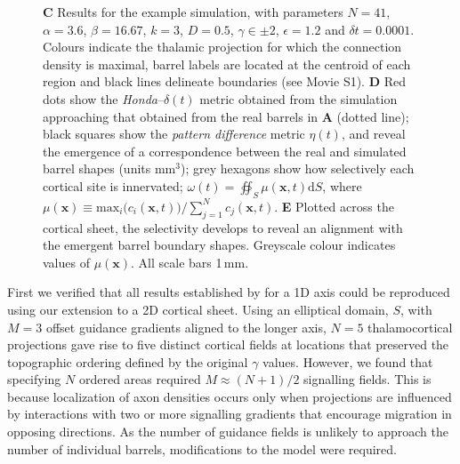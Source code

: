 \documentclass[9pt,lineno]{elife}
\newcommand{\cmnt}[1]{\textcolor{colcmnt}{#1}}
\newcommand{\MPtwo}[1]{\textcolor{colmptwo}{#1}}
\newcommand{\metrics}[1]{\textcolor{colmetrics}{#1}}
\newcommand{\mb}[1]{\mathbf{#1}}
\begin{document}
\begin{figure}
\begin{fullwidth}
{      \textbf{C} Results for the example simulation, with parameters
      \MPtwo{$N=41$, $\alpha=3.6$, $\beta=16.67$, $k=3$, $D=0.5$,
        $\gamma\in\pm 2$, $\epsilon=1.2$} and $\delta{t}=0.0001$. Colours
      indicate the thalamic projection for which the connection density is
      maximal, \cmnt{barrel labels are located at the centroid of each
        region and} black lines delineate boundaries (see Movie S1).
      \textbf{D} Red dots show the \emph{Honda}--\metrics{$\delta(t)$} metric
      obtained from \metrics{the} simulation approaching that obtained from
      the \metrics{real} barrels in \textbf{A} (dotted line); black squares
      show the \emph{pattern difference} metric $\eta(t)$, and reveal the
      emergence of a correspondence between the real and simulated barrel
      shapes (units mm$^3$); \metrics{grey hexagons show how selectively each
        cortical site is innervated;
        $\omega(t) = \oiint_{S} \mu(\mb{x},t) \mathrm{d}S$, where
        $\mu(\mb{x}) \equiv \mathrm{max}_i\big(c_i(\mb{x},t)\big)\big/\sum_{j=1}^{N} c_j(\mb{x},t)$.}
      \textbf{E} \metrics{Plotted across the cortical sheet, the selectivity
        develops to reveal an alignment with the emergent barrel boundary
        shapes}. \metrics{Greyscale colour indicates values of $\mu(\mb{x})$.}
      All scale bars 1\,mm.}
    \label{fig:main}
  \end{fullwidth}
\end{figure}

First we verified that all results established by \cite{karbowski_model_2004}
for a 1D axis could be reproduced using our extension to a 2D cortical
sheet. Using an elliptical domain, $S$, with $M=3$ offset guidance gradients
aligned to the longer axis, $N=5$ thalamocortical projections gave rise to
five distinct cortical fields at locations that preserved the topographic
ordering defined by the original $\gamma$ values. However, we found that
specifying $N$ ordered areas required $M\approx (N+1)/2$ signalling
fields. This is because localization of axon densities occurs only when
projections are influenced by interactions with two or more signalling
gradients that encourage migration in opposing directions. As the number of
guidance fields is unlikely to approach the number of individual barrels,
\cmnt{modifications to the model} were required.
\end{document}

